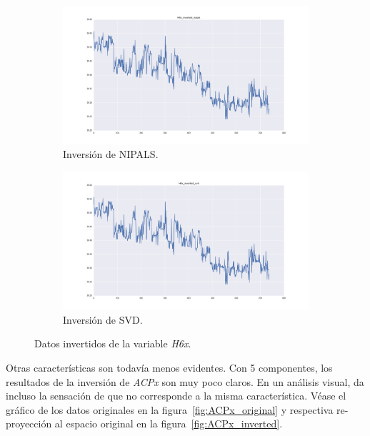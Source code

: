 \documentclass[11pt,spanish,listoffigures,listoftables]{tfgetsinf}
\begin{document}
    \begin{figure}[h]
        \centering
        \begin{subfigure}[h]{0.49\textwidth}
            \centering
            \includegraphics[width=\textwidth]{H6x_inverted_nipals.png}
            \caption{Inversión de NIPALS.}
            \label{fig:H6x_inverted_nipals}
        \end{subfigure}
        \begin{subfigure}[h]{0.49\textwidth}
            \centering
            \includegraphics[width=\textwidth]{H6x_inverted_svd.png}
            \caption{Inversión de SVD.}
            \label{fig:H6x_inverted_svd}
        \end{subfigure}
        \caption{Datos invertidos de la variable {\em H6x}.}
        \label{fig:H6x_inverted}
    \end{figure}
    
    Otras características son todavía menos evidentes. Con 5 componentes, los resultados de la inversión de {\em ACPx} son muy poco claros. En un análisis visual, da incluso la sensación de que no corresponde a la misma característica. Véase el gráfico de los datos originales en la figura~\ref{fig:ACPx_original} y respectiva re-proyección al espacio original en la figura~\ref{fig:ACPx_inverted}.
\end{document}
